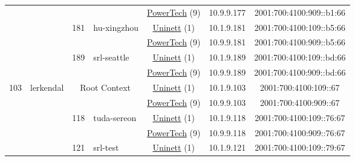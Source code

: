 \begin{small}
\begin{center}
\begin{longtable}{|c|c|c|c|c|c|c|c|}
  &  &  &  & \multicolumn{2}{|c|}{\tiny{\href{http://www.powertech.no}{PowerTech} (9)}} & \tiny{10.9.9.177} & \tiny{2001:700:4100:909::b1:66} \\* \cline{3-3}\cline{4-4}\cline{5-5}\cline{6-6}\cline{7-7}\cline{8-8}
  &  & \multirow{2}{*}{\tiny{181}} & \multicolumn{1}{|l|}{\multirow{2}{*}{\tiny{hu-xingzhou}}} & \multicolumn{2}{|c|}{\tiny{\href{https://www.uninett.no}{Uninett} (1)}} & \tiny{10.1.9.181} & \tiny{2001:700:4100:109::b5:66} \\* \cline{5-5}\cline{6-6}\cline{7-7}\cline{8-8}
  &  &  &  & \multicolumn{2}{|c|}{\tiny{\href{http://www.powertech.no}{PowerTech} (9)}} & \tiny{10.9.9.181} & \tiny{2001:700:4100:909::b5:66} \\* \cline{3-3}\cline{4-4}\cline{5-5}\cline{6-6}\cline{7-7}\cline{8-8}
  &  & \multirow{2}{*}{\tiny{189}} & \multicolumn{1}{|l|}{\multirow{2}{*}{\tiny{srl-seattle}}} & \multicolumn{2}{|c|}{\tiny{\href{https://www.uninett.no}{Uninett} (1)}} & \tiny{10.1.9.189} & \tiny{2001:700:4100:109::bd:66} \\* \cline{5-5}\cline{6-6}\cline{7-7}\cline{8-8}
  &  &  &  & \multicolumn{2}{|c|}{\tiny{\href{http://www.powertech.no}{PowerTech} (9)}} & \tiny{10.9.9.189} & \tiny{2001:700:4100:909::bd:66} \\ \hline
 \multirow{26}{*}{\tiny{103}} & \multicolumn{1}{|l|}{\multirow{26}{*}{\tiny{lerkendal}}} & \multicolumn{2}{|c|}{\multirow{2}{*}{\tiny{Root Context}}} & \multicolumn{2}{|c|}{\tiny{\href{https://www.uninett.no}{Uninett} (1)}} & \tiny{10.1.9.103} & \tiny{2001:700:4100:109::67} \\* \cline{5-5}\cline{6-6}\cline{7-7}\cline{8-8}
  &  & \multicolumn{2}{|c|}{} & \multicolumn{2}{|c|}{\tiny{\href{http://www.powertech.no}{PowerTech} (9)}} & \tiny{10.9.9.103} & \tiny{2001:700:4100:909::67} \\* \cline{3-3}\cline{4-4}\cline{5-5}\cline{6-6}\cline{7-7}\cline{8-8}
  &  & \multirow{2}{*}{\tiny{118}} & \multicolumn{1}{|l|}{\multirow{2}{*}{\tiny{tuda-sereon}}} & \multicolumn{2}{|c|}{\tiny{\href{https://www.uninett.no}{Uninett} (1)}} & \tiny{10.1.9.118} & \tiny{2001:700:4100:109::76:67} \\* \cline{5-5}\cline{6-6}\cline{7-7}\cline{8-8}
  &  &  &  & \multicolumn{2}{|c|}{\tiny{\href{http://www.powertech.no}{PowerTech} (9)}} & \tiny{10.9.9.118} & \tiny{2001:700:4100:909::76:67} \\* \cline{3-3}\cline{4-4}\cline{5-5}\cline{6-6}\cline{7-7}\cline{8-8}
  &  & \multirow{2}{*}{\tiny{121}} & \multicolumn{1}{|l|}{\multirow{2}{*}{\tiny{srl-test}}} & \multicolumn{2}{|c|}{\tiny{\href{https://www.uninett.no}{Uninett} (1)}} & \tiny{10.1.9.121} & \tiny{2001:700:4100:109::79:67} \\* \cline{5-5}\cline{6-6}\cline{7-7}\cline{8-8}

\end{longtable}
\end{center}
\end{small}
